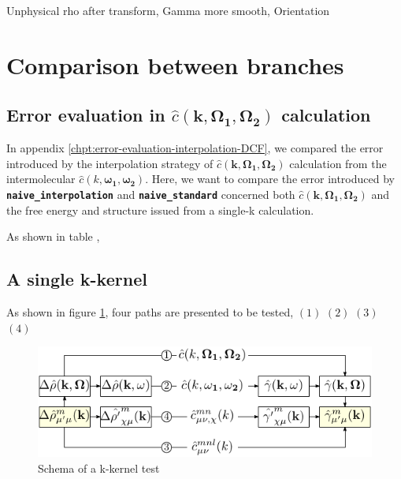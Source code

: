 Unphysical rho after transform, Gamma more smooth, Orientation 


\section{Comparison between branches}


\subsection{Error evaluation in $\hat{c}(\mathbf{k},\mathbf{\Omega_{1}},\mathbf{\Omega_{2}})$
calculation}

In appendix \ref{chpt:error-evaluation-interpolation-DCF}, we compared
the error introduced by the interpolation strategy of $\hat{c}(\mathbf{k},\mathbf{\Omega_{1}},\mathbf{\Omega_{2}})$
calculation from the intermolecular $\hat{c}(k,\boldsymbol{\omega_{1}},\boldsymbol{\omega_{2}})$.
Here, we want to compare the error introduced by \texttt{\textbf{naive\_interpolation}}
and\textbf{ }\texttt{\textbf{naive\_standard}} concerned both $\hat{c}(\mathbf{k},\mathbf{\Omega_{1}},\mathbf{\Omega_{2}})$
and the free energy and structure issued from a single-k calculation.

As shown in table , 


\subsection{A single k-kernel\label{sub:A-single-k-kernel}}

As shown in figure \ref{fig:k-kernel}, four paths are presented to
be tested, $(1)$ $(2)$ $(3)$ $(4)$

\begin{figure}[h]
\begin{centering}
\includegraphics{_figure/algorithms_q}
\par\end{centering}

\caption{Schema of a k-kernel test \label{fig:k-kernel} }
\end{figure}


